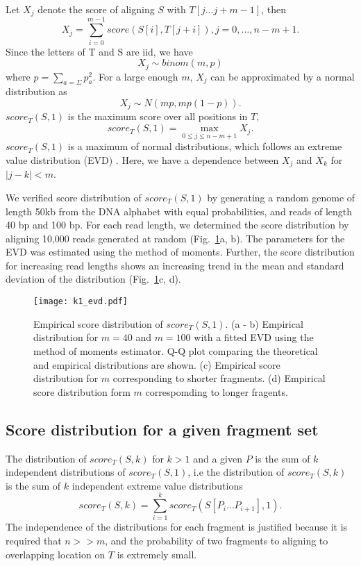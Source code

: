 Let $X_j$ denote the score of aligning $S$ with $T[j \dots j+m-1]$, then
\[X_j = \sum_{i=0}^{m-1} score(S[i],T[j+i]), j = 0, \dots, n-m+1.\]
Since the letters of T and S are iid, we have \[X_j \sim binom(m,p)\]
where $p = \sum_{a=\Sigma} p_a^2$.  For a large enough $m$, $X_j$ can
be approximated by a normal distribution as \[X_j \sim N(mp, mp(1-p)).
\] $score_T(S,1)$ is the maximum score over all positions in $T$,
\[score_T(S,1) = \max_{0 \leq j \leq n-m+1} X_j.\] $score_T(S,1)$ is a
maximum of normal distributions, which follows an extreme value
distribution (EVD) \citep{kotz2000extreme}.
Here, we have a dependence between $X_j$ and $X_k$ for $|j - k| < m$.

We verified score distribution of $score_T(S,1)$ by generating a random
genome of length 50kb from the DNA alphabet with equal probabilities,
and reads of length 40 bp and 100 bp. For each read length, we
determined the score distribution by aligning 10,000 reads generated at
random (Fig.~\ref{evd_approx}a, b). The parameters for the EVD was
estimated using the method of moments.
Further, the score distribution for increasing read lengths shows an
increasing trend in the mean and standard deviation of the distribution
(Fig.~\ref{evd_approx}c, d).

\begin{figure}[H]
\centering
\texttt{[image: k1\_evd.pdf]}
\caption{Empirical score distribution of $score_T(S,1)$. (a - b) Empirical
  distribution for $m=40$ and $m=100$ with a fitted EVD using the method
  of moments estimator. Q-Q plot comparing the theoretical and empirical
  distributions are shown.
  (c) Empirical score distribution for $m$ corresponding to shorter
  fragments.
  (d) Empirical score distribution form $m$ correspomding to longer
  fragents.}
\label{evd_approx}
\end{figure}



\subsection{Score distribution for a given fragment set}
The distribution of $score_T(S,k)$ for $k > 1$ and a given $P$ is the
sum of $k$ independent distributions of $score_T(S,1)$, i.e the
distribution of $score_T(S,k)$ is the sum of $k$ independent extreme
value distributions \[score_T(S,k) = \sum_{i=1}^{k} score_T(S[P_i \dots
P_{i+1}], 1).\]
The independence of the distributions for each fragment is justified
because it is required that $n >> m$, and the probability of two
fragments to aligning to overlapping location on $T$ is extremely small.

